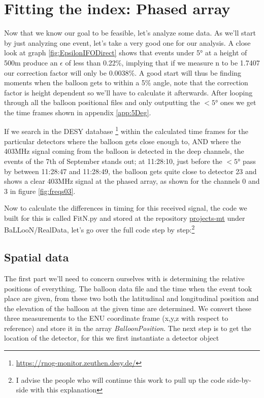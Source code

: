 \section{Fitting the index: Phased array}
Now that we know our goal to be feasible, let's analyze some data.  As we'll
start by just analyzing one event, let's take a very good one for our analysis.
A close look at graph \ref{fig:EpsilonIFODirect} shows that events under 5° at
a height of 500m produce an $\epsilon$ of less than 0.22\%, implying that if we
measure n to be 1.7407 our correction factor will only be 0.0038\%.  A good start will
thus be finding moments when the balloon gets to within a 5\% angle, note that
the correction factor is height dependent so we'll have to calculate it afterwards.  After
looping through all the balloon positional files and only outputting the $<5$°
ones we get the time frames shown in appendix \ref{app:5Deg}.

If we search in the DESY database
\footnote{\url{https://rnog-monitor.zeuthen.desy.de/}} within the calculated
time frames for the particular detectors where the balloon gets close enough to,
AND where the 403MHz signal coming from the balloon is detected in the deep channels, the events of the 7th
of September stands out; at 11:28:10,  just before the $<5$° pass by between
11:28:47 and 11:28:49, the balloon gets quite close to detector 23 and shows a
clear 403MHz signal at the phased array, as shown for the channels 0 and 3 in
figure \ref{fig:freqs03}.

Now to calculate the differences in timing for this received signal, the code
we built for this is called FitN.py and stored at the repository
\href{https://github.com/arthuradriaens-code/projects-mt.git}{projects-mt}
under BaLLooN/RealData, let's go over the full code step by step:\footnote{I advise 
the people who will continue this work to pull up the code side-by-side with this 
explanation}

\subsection{Spatial data}
The first part we'll need to concern ourselves with is determining the relative
positions of everything. The balloon data file and the time when the event took
place are given, from these two both the latitudinal and longitudinal position
and the elevation of the balloon at the given time are determined. We convert
these three measurements to the ENU coordinate frame (x,y,z with respect to
reference) and store it in the array \textit{BalloonPosition}. The next step is
to get the location of the detector, for this we first instantiate a detector
object 

